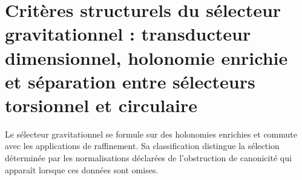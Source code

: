 \chapter{Critères structurels du sélecteur gravitationnel : transducteur dimensionnel, holonomie enrichie et séparation entre sélecteurs torsionnel et circulaire}
\label{chap:parte-iv-66}
Le sélecteur gravitationnel se formule sur des holonomies enrichies et commute
avec les applications de raffinement. Sa classification distingue la sélection
déterminée par les normalisations déclarées de l'obstruction de
canonicité qui apparaît lorsque ces données sont omises.

\begingroup
\let\HMTOwnerSection\section
\let\HMTOwnerSubsection\subsection
\let\HMTOwnerSubsubsection\subsubsection
\let\HMTOwnerParagraph\paragraph
\let\chapter\HMTOwnerSection
\let\section\HMTOwnerSubsection
\let\subsection\HMTOwnerSubsubsection
\let\subsubsection\HMTOwnerParagraph

\endgroup
\begingroup
\let\HMTOwnerSection\section
\let\HMTOwnerSubsection\subsection
